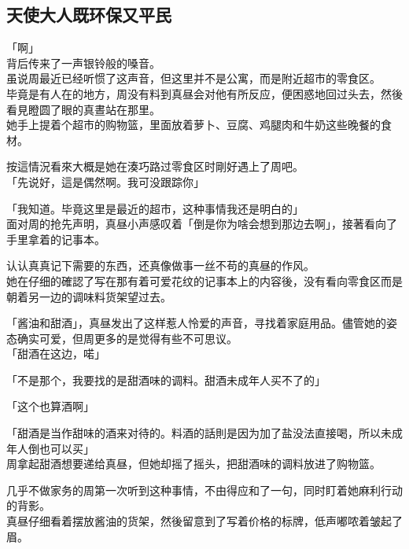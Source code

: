 \subsection{天使大人既环保又平民}

「啊」\\

背后传来了一声银铃般的嗓音。\\

虽说周最近已经听惯了这声音，但这里并不是公寓，而是附近超市的零食区。\\

毕竟是有人在的地方，周没有料到真昼会对他有所反应，便困惑地回过头去，然後看見瞪圆了眼的真晝站在那里。\\

她手上提着个超市的购物篮，里面放着萝卜、豆腐、鸡腿肉和牛奶这些晚餐的食材。

按這情況看來大概是她在湊巧路过零食区时剛好遇上了周吧。\\

「先说好，這是偶然啊。我可没跟踪你」

「我知道。毕竟这里是最近的超市，这种事情我还是明白的」\\

面对周的抢先声明，真昼小声感叹着「倒是你为啥会想到那边去啊」，接著看向了手里拿着的记事本。

认认真真记下需要的东西，还真像做事一丝不苟的真昼的作风。\\

她在仔细的確認了写在那有着可爱花纹的记事本上的内容後，没有看向零食区而是朝着另一边的调味料货架望过去。

「酱油和甜酒」，真昼发出了这样惹人怜爱的声音，寻找着家庭用品。儘管她的姿态确实可爱，但周更多的是觉得有些不可思议。\\

「甜酒在这边，喏」

「不是那个，我要找的是甜酒味的调料。甜酒未成年人买不了的」

「这个也算酒啊」

「甜酒是当作甜味的酒来对待的。料酒的話則是因为加了盐没法直接喝，所以未成年人倒也可以买」\\

周拿起甜酒想要递给真昼，但她却摇了摇头，把甜酒味的调料放进了购物篮。

几乎不做家务的周第一次听到这种事情，不由得应和了一句，同时盯着她麻利行动的背影。\\

真昼仔细看着摆放酱油的货架，然後留意到了写着价格的标牌，低声嘟哝着皱起了眉。\\

